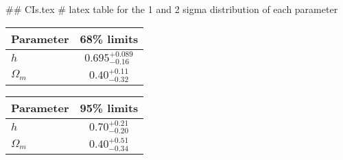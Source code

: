 ## CIs.tex
# latex table for the 1 and 2 sigma distribution of each parameter

\begin{tabular} { l  c}
 Parameter &  68\% limits\\
\hline
{\boldmath$h              $} & $0.695^{+0.089}_{-0.16}    $\\
{\boldmath$\Omega_m       $} & $0.40^{+0.11}_{-0.32}      $\\
\hline
\end{tabular}

\begin{tabular} { l  c}
 Parameter &  95\% limits\\
\hline
{\boldmath$h              $} & $0.70^{+0.21}_{-0.20}      $\\
{\boldmath$\Omega_m       $} & $0.40^{+0.51}_{-0.34}      $\\
\hline
\end{tabular}
